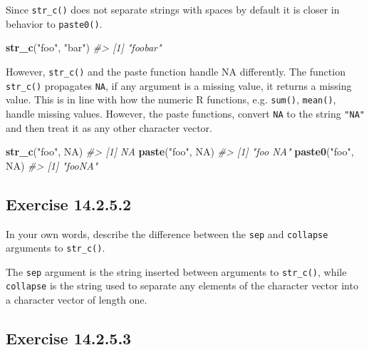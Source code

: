 \documentclass[]{book}
\newenvironment{Shaded}{\begin{snugshade}}{\end{snugshade}}
\newcommand{\CommentTok}[1]{\textcolor[rgb]{0.56,0.35,0.01}{\textit{#1}}}
\newcommand{\KeywordTok}[1]{\textcolor[rgb]{0.13,0.29,0.53}{\textbf{#1}}}
\newcommand{\NormalTok}[1]{#1}
\newcommand{\OtherTok}[1]{\textcolor[rgb]{0.56,0.35,0.01}{#1}}
\newcommand{\StringTok}[1]{\textcolor[rgb]{0.31,0.60,0.02}{#1}}
\theoremstyle{plain}
\theoremstyle{remark}
\begin{document}
Since \texttt{str\_c()} does not separate strings with spaces by default it is closer in behavior to \texttt{paste0()}.

\begin{Shaded}
\begin{Highlighting}[]
\KeywordTok{str_c}\NormalTok{(}\StringTok{"foo"}\NormalTok{, }\StringTok{"bar"}\NormalTok{)}
\CommentTok{#> [1] "foobar"}
\end{Highlighting}
\end{Shaded}

However, \texttt{str\_c()} and the paste function handle NA differently.
The function \texttt{str\_c()} propagates \texttt{NA}, if any argument is a missing value, it returns a missing value.
This is in line with how the numeric R functions, e.g. \texttt{sum()}, \texttt{mean()}, handle missing values.
However, the paste functions, convert \texttt{NA} to the string \texttt{"NA"} and then treat it as any other character vector.

\begin{Shaded}
\begin{Highlighting}[]
\KeywordTok{str_c}\NormalTok{(}\StringTok{"foo"}\NormalTok{, }\OtherTok{NA}\NormalTok{)}
\CommentTok{#> [1] NA}
\KeywordTok{paste}\NormalTok{(}\StringTok{"foo"}\NormalTok{, }\OtherTok{NA}\NormalTok{)}
\CommentTok{#> [1] "foo NA"}
\KeywordTok{paste0}\NormalTok{(}\StringTok{"foo"}\NormalTok{, }\OtherTok{NA}\NormalTok{)}
\CommentTok{#> [1] "fooNA"}
\end{Highlighting}
\end{Shaded}

\hypertarget{exercise-14.2.5.2}{%
\subsection*{\texorpdfstring{Exercise {14.2.5.2}}{Exercise 14.2.5.2}}\label{exercise-14.2.5.2}}

In your own words, describe the difference between the \texttt{sep} and \texttt{collapse} arguments to \texttt{str\_c()}.

The \texttt{sep} argument is the string inserted between arguments to \texttt{str\_c()}, while \texttt{collapse} is the string used to separate any elements of the character vector into a character vector of length one.

\hypertarget{exercise-14.2.5.3}{%
\subsection*{\texorpdfstring{Exercise {14.2.5.3}}{Exercise 14.2.5.3}}\label{exercise-14.2.5.3}}
\end{document}
